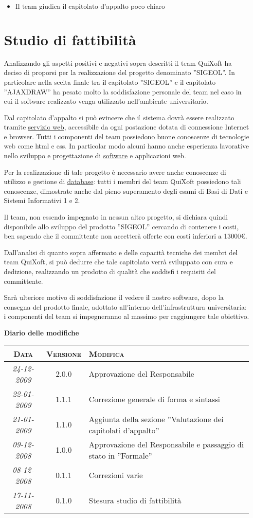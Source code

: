 \documentclass[11pt,a4paper]{article}
\newcommand{\modifiche} 
{
\newpage
\begin{center}
\textbf{Diario delle modifiche} \\
\bigskip
\begin{tabular}{|c|c|p{0.62\textwidth}|}
\hline
\textsc{Data} & \textsc{Versione} & \textsc{Modifica} \\
\hline
\hline
\textit{24-12-2009} & 2.0.0 & Approvazione del Responsabile\\
\hline
\textit{22-01-2009} & 1.1.1 & Correzione generale di forma e sintassi  \\
\hline
\textit{21-01-2009} & 1.1.0 & Aggiunta della sezione ''Valutazione dei capitolati d'appalto''  \\
\hline
\textit{09-12-2008} & 1.0.0 & Approvazione del Responsabile e passaggio di stato in ''Formale''\\
\hline
\textit{08-12-2008} & 0.1.1 & Correzioni varie  \\
\hline
\textit{17-11-2008} & 0.1.0 & Stesura studio di fattibilità \\
\hline
\end{tabular}
\end{center}
}
\begin{document}
\begin{itemize}
 \item Il team giudica il capitolato d'appalto poco chiaro
\end{itemize}

\section{Studio di fattibilità}
Analizzando gli aspetti positivi e negativi sopra descritti il team QuiXoft ha deciso di proporsi per la realizzazione del progetto denominato ''SIGEOL''. In particolare nella scelta finale tra il capitolato ''SIGEOL'' e il capitolato ''AJAXDRAW'' ha pesato molto la soddisfazione personale del team nel caso in cui il software realizzato venga utilizzato nell'ambiente universitario.

Dal capitolato d'appalto si può evincere che il sistema dovrà essere realizzato tramite  \underline{servizio web}, accessibile da ogni postazione dotata di connessione Internet e browser.
Tutti i componenti del team possiedono buone conoscenze di tecnologie web come html e css.
In particolar modo alcuni hanno anche esperienza lavorative nello sviluppo e progettazione di \underline{software} e applicazioni web.

Per la realizzazione di tale progetto è necessario avere anche conoscenze di utilizzo e gestione di \underline{database}: tutti i membri del team QuiXoft possiedono tali conoscenze, dimostrate anche dal pieno superamento degli esami di Basi di Dati e Sistemi Informativi 1 e 2.

Il team, non essendo impegnato in nessun altro progetto, si dichiara quindi disponibile allo sviluppo del prodotto ''SIGEOL'' cercando di contenere i costi, ben sapendo che il committente non accetterà offerte con costi inferiori a 13000\euro.

Dall'analisi di quanto sopra affermato e delle capacità tecniche dei membri del team QuiXoft, si può dedurre che tale capitolato verrà sviluppato con cura e dedizione, realizzando un prodotto di qualità che soddisfi i requisiti del committente.

Sarà ulteriore motivo di soddisfazione il vedere il nostro software, dopo la consegna del prodotto finale, adottato all'interno dell'infrastruttura universitaria: i componenti  del team si impegneranno al massimo per raggiungere tale obiettivo.
\modifiche
\end{document}
